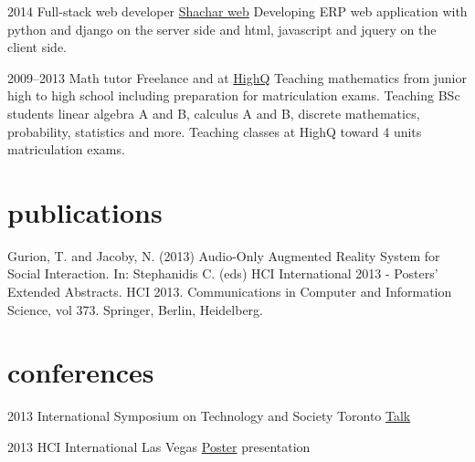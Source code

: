 \documentclass[]{friggeri-cv}
\begin{document}
\begin{entrylist}

    \entry
    {2014}
    {Full-stack web developer}
    {\href{http://www.shachar-web.co.il/}{Shachar web}}
    {
      Developing ERP web application with python and django on the server side and html, javascript and jquery on the client side.
    }

\end{entrylist}
\begin{entrylist}

    \entry
    {2009--2013}
    {Math tutor}
    {Freelance and at \href{http://high-q.co.il/}{HighQ}}
    {
      Teaching mathematics from junior high to high school including preparation for matriculation exams.
      Teaching BSc students linear algebra A and B, calculus A and B, discrete mathematics, probability, statistics and more.
      Teaching classes at HighQ toward 4 units matriculation exams.
    }

\end{entrylist}



\section{publications}

Gurion, T. and Jacoby, N. (2013) Audio-Only Augmented Reality System for Social Interaction. In: Stephanidis C. (eds) HCI International 2013 - Posters’ Extended Abstracts. HCI 2013. Communications in Computer and Information Science, vol 373. Springer, Berlin, Heidelberg.



\section{conferences}

\begin{entrylist}

    \entry
    {2013}
    {International Symposium on Technology and Society}
    {Toronto}
    {\href{http://www.slideshare.net/Nagasaki45/audioonly-augmented-reality-system-for-social-interaction}{Talk}}

\end{entrylist}
\begin{entrylist}

    \entry
    {2013}
    {HCI International}
    {Las Vegas}
    {\href{http://www.tomgurion.me/pdfs/HCI2013 poster.pdf}{Poster} presentation}

\end{entrylist}
\end{document}
